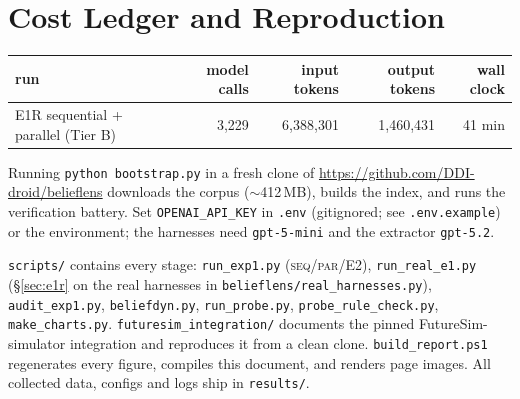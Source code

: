 \documentclass[10pt]{article}
\newcommand{\seq}{\textsc{seq}}
\newcommand{\pl}{\textsc{par}}
\begin{document}
\section{Cost Ledger and Reproduction}\label{app:cost}
\begin{center}\small
\begin{tabular}{@{}lrrrr@{}}
\toprule
run & model calls & input tokens & output tokens & wall clock \\
\midrule
E1R sequential + parallel (Tier B) & 3{,}229 & 6{,}388{,}301 & 1{,}460{,}431 & 41 min \\
\bottomrule
\end{tabular}
\label{tab:cost}
\end{center}

\noindent Running \texttt{python bootstrap.py} in a fresh clone of
\url{https://github.com/DDI-droid/belieflens} downloads the corpus ($\sim$412\,MB), builds the index, and runs the verification battery. Set
\texttt{OPENAI\_API\_KEY} in \texttt{.env} (gitignored; see \texttt{.env.example}) or the
environment; the harnesses need \texttt{gpt-5-mini} and the extractor \texttt{gpt-5.2}.

\noindent\texttt{scripts/} contains every stage: \texttt{run\_exp1.py} (\seq/\pl/E2),
\texttt{run\_real\_e1.py} (\S\ref{sec:e1r} on the real harnesses in
\texttt{belieflens/real\_harnesses.py}), \texttt{audit\_exp1.py}, \texttt{beliefdyn.py},
\texttt{run\_probe.py}, \texttt{probe\_rule\_check.py}, \texttt{make\_charts.py}.
\texttt{futuresim\_integration/} documents the pinned FutureSim-simulator integration and
reproduces it from a clean clone. \texttt{build\_report.ps1} regenerates every figure, compiles
this document, and renders page images. All collected data, configs and logs ship in
\texttt{results/}.
\end{document}
